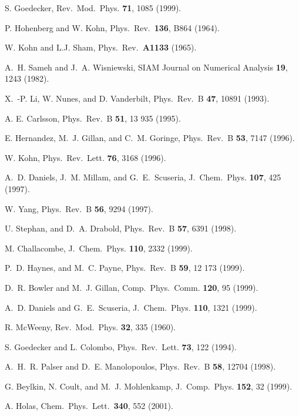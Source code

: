 \commentoutA{\documentclass[prb,aps,twocolumn,twocolumngrid,secnumarabic,superbib,hyperref]{revtex4}}
\begin{document}
\begin{references}

 S. Goedecker,
Rev.\ Mod.\ Phys. {\bf 71}, 1085 (1999).

 P. Hohenberg and W. Kohn,
Phys.\ Rev.\ {\bf 136}, B864 (1964).

 W. Kohn and L.J. Sham,
Phys.\ Rev.\ {\bf A1133} (1965).

  A.\ H. Sameh and J.\ A. Wisniewski,
SIAM Journal on Numerical Analysis {\bf 19}, 1243 (1982).

 X.\ -P. Li, W. Nunes, and D. Vanderbilt,
Phys.\ Rev.\ B {\bf 47}, 10891 (1993).

 A. E. Carlsson,
Phys.\ Rev.\ B {\bf 51}, 13 935 (1995).

 E. Hernandez, M.\ J. Gillan, and C.\ M. Goringe,
Phys.\ Rev.\ B {\bf 53}, 7147 (1996).

 W. Kohn,
Phys.\ Rev.\ Lett. {\bf 76}, 3168 (1996).

 A.\ D. Daniels, J.\ M. Millam, and G.\ E.\ Scuseria,
J.\ Chem.\ Phys. {\bf 107}, 425 (1997).

 W. Yang,
Phys.\ Rev.\ B {\bf 56}, 9294 (1997).

 U. Stephan, and D.\ A. Drabold,
Phys.\ Rev.\ B {\bf 57}, 6391 (1998).

 M. Challacombe,
J.\ Chem.\ Phys. {\bf 110}, 2332 (1999).

 P.\ D. Haynes, and M.\ C. Payne,
Phys.\ Rev.\ B {\bf 59}, 12 173 (1999).

 D.\ R. Bowler and M.\ J. Gillan,
Comp.\ Phys.\ Comm. {\bf 120}, 95 (1999).

 A.\ D. Daniels and G.\ E.\ Scuseria,
J.\ Chem.\ Phys. {\bf 110}, 1321 (1999).

 R. McWeeny,
Rev.\ Mod.\ Phys. {\bf 32}, 335 (1960).

 S. Goedecker and L. Colombo,
Phys.\ Rev.\ Lett. {\bf 73}, 122 (1994).

 A.\ H.\ R. Palser and D.\ E. Manolopoulos,
Phys.\ Rev.\ B {\bf 58}, 12704 (1998). 

 G. Beylkin, N. Coult, and M.\ J. Mohlenkamp,
J.\ Comp.\ Phys. {\bf 152}, 32 (1999).

 A. Holas, Chem.\ Phys.\ Lett.\ {\bf 340}, 552 (2001).


\end{references}
\end{document}

